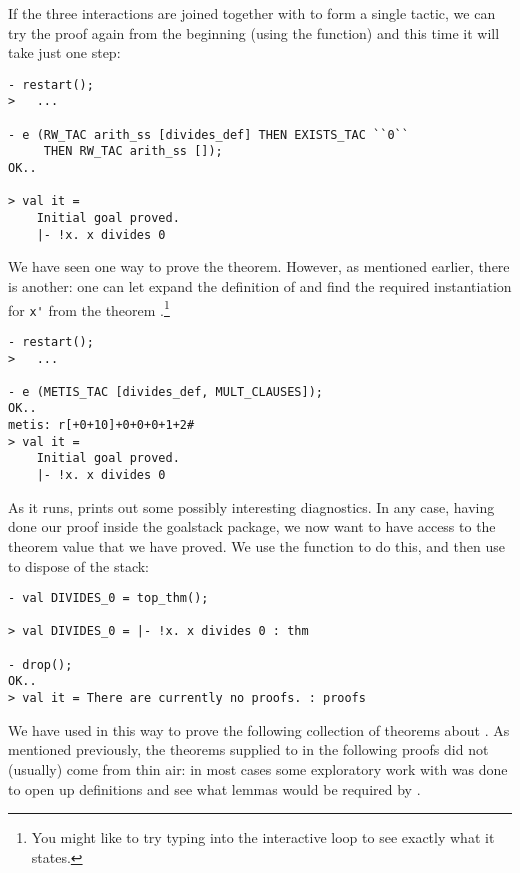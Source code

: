 If the three interactions are joined together with  to
form a single tactic, we can try the proof again from the
beginning (using the  function) and this time it will
take just one step:
\begin{session}
\begin{verbatim}
- restart();
>   ...

- e (RW_TAC arith_ss [divides_def] THEN EXISTS_TAC ``0``
     THEN RW_TAC arith_ss []);
OK..

> val it =
    Initial goal proved.
    |- !x. x divides 0
\end{verbatim}
\end{session}
We have seen one way to prove the theorem. However, as mentioned
earlier, there is another: one can let  expand the
definition of  and find the required instantiation for
\verb+x'+ from the theorem .\footnote{You might
  like to try typing  into the interactive loop
  to see exactly what it states.}
\begin{session}
\begin{verbatim}
- restart();
>   ...

- e (METIS_TAC [divides_def, MULT_CLAUSES]);
OK..
metis: r[+0+10]+0+0+0+1+2#
> val it =
    Initial goal proved.
    |- !x. x divides 0
\end{verbatim}
\end{session}
As it runs,  prints out some possibly interesting
diagnostics. In any case, having done our proof inside the goalstack package,
    we now want to have access to the theorem value that we have
    proved.  We use the  function to do this, and then
    use  to dispose of the stack:
\begin{session}
\begin{verbatim}
- val DIVIDES_0 = top_thm();

> val DIVIDES_0 = |- !x. x divides 0 : thm

- drop();
OK..
> val it = There are currently no proofs. : proofs
\end{verbatim}
\end{session}

We have used  in this way to prove the following
collection of theorems about . As mentioned previously, the
theorems supplied to  in the following proofs did not
(usually) come from thin air: in most cases some exploratory work with
 was done to open up definitions and see what lemmas would
be required by .

